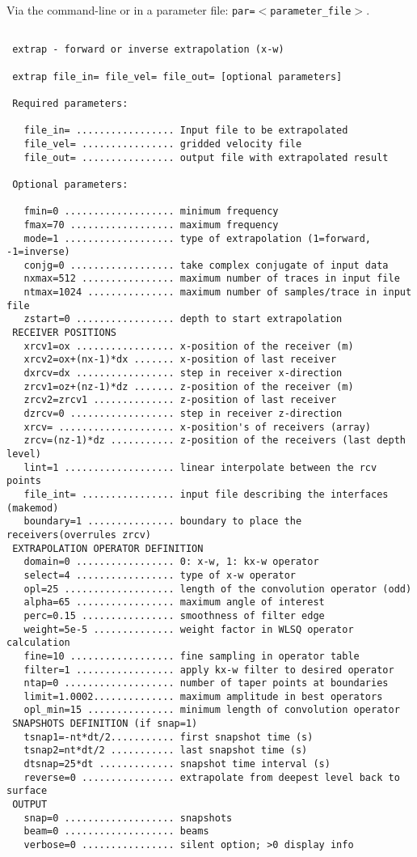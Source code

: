 Via the command-line or in a parameter file: {\tt par=$<$parameter\_file$>$}.
{\footnotesize
\begin{verbatim}
  
 extrap - forward or inverse extrapolation (x-w)
  
 extrap file_in= file_vel= file_out= [optional parameters]
  
 Required parameters:
 
   file_in= ................. Input file to be extrapolated
   file_vel= ................ gridded velocity file 
   file_out= ................ output file with extrapolated result
  
 Optional parameters:
 
   fmin=0 ................... minimum frequency 
   fmax=70 .................. maximum frequency
   mode=1 ................... type of extrapolation (1=forward, -1=inverse)
   conjg=0 .................. take complex conjugate of input data
   nxmax=512 ................ maximum number of traces in input file
   ntmax=1024 ............... maximum number of samples/trace in input file
   zstart=0 ................. depth to start extrapolation
 RECEIVER POSITIONS 
   xrcv1=ox ................. x-position of the receiver (m)
   xrcv2=ox+(nx-1)*dx ....... x-position of last receiver
   dxrcv=dx ................. step in receiver x-direction
   zrcv1=oz+(nz-1)*dz ....... z-position of the receiver (m)
   zrcv2=zrcv1 .............. z-position of last receiver
   dzrcv=0 .................. step in receiver z-direction
   xrcv= .................... x-position's of receivers (array)
   zrcv=(nz-1)*dz ........... z-position of the receivers (last depth level)
   lint=1 ................... linear interpolate between the rcv points
   file_int= ................ input file describing the interfaces (makemod)
   boundary=1 ............... boundary to place the receivers(overrules zrcv)
 EXTRAPOLATION OPERATOR DEFINITION 
   domain=0 ................. 0: x-w, 1: kx-w operator
   select=4 ................. type of x-w operator
   opl=25 ................... length of the convolution operator (odd)
   alpha=65 ................. maximum angle of interest
   perc=0.15 ................ smoothness of filter edge
   weight=5e-5 .............. weight factor in WLSQ operator calculation
   fine=10 .................. fine sampling in operator table
   filter=1 ................. apply kx-w filter to desired operator
   ntap=0 ................... number of taper points at boundaries
   limit=1.0002.............. maximum amplitude in best operators
   opl_min=15 ............... minimum length of convolution operator
 SNAPSHOTS DEFINITION (if snap=1) 
   tsnap1=-nt*dt/2........... first snapshot time (s)
   tsnap2=nt*dt/2 ........... last snapshot time (s)
   dtsnap=25*dt ............. snapshot time interval (s)
   reverse=0 ................ extrapolate from deepest level back to surface
 OUTPUT 
   snap=0 ................... snapshots
   beam=0 ................... beams
   verbose=0 ................ silent option; >0 display info
 

\end{verbatim}}
